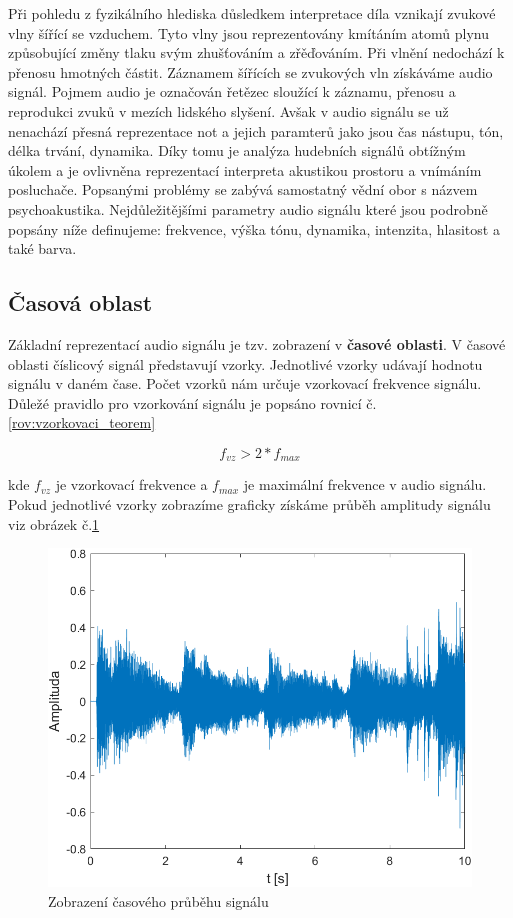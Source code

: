   Při pohledu z fyzikálního hlediska důsledkem interpretace díla vznikají zvukové vlny šířící se vzduchem.
  Tyto vlny jsou reprezentovány kmítáním atomů plynu způsobující změny tlaku svým zhušťováním a zřěďováním. Při vlnění nedochází k přenosu hmotných částit.
  Záznamem šířících se zvukových vln získáváme audio signál.
  Pojmem audio je označován řetězec sloužící k záznamu, přenosu a reprodukci zvuků v mezích lidského slyšení. 
  Avšak v audio signálu se už nenachází přesná reprezentace not a jejich paramterů jako jsou čas nástupu, tón, délka trvání, dynamika.
  Díky tomu je analýza hudebních signálů obtížným úkolem a je ovlivněna reprezentací interpreta akustikou prostoru a vnímáním posluchače.
  Popsanými problémy se zabývá samostatný vědní obor s názvem psychoakustika.
  Nejdůležitějšími parametry audio signálu které jsou podrobně popsány níže definujeme: frekvence, výška tónu, dynamika, intenzita, hlasitost a také barva.


  \subsection{Časová oblast}
  Základní reprezentací audio signálu je tzv. zobrazení v \textbf{časové oblasti}.
  V časové oblasti číslicový signál představují vzorky. Jednotlivé vzorky udávají hodnotu signálu v daném čase.
  Počet vzorků nám určuje vzorkovací frekvence signálu. Důležé pravidlo pro vzorkování signálu je popsáno rovnicí č. \ref{rov:vzorkovaci_teorem}
  
  \begin{equation}
    f_{vz} > 2 * f_{max}
    \label{rov:vzorkovaci_teorem}
  \end{equation}

  kde $f_{vz}$ je vzorkovací frekvence a $f_{max}$ je maximální frekvence v audio signálu.  
  Pokud jednotlivé vzorky zobrazíme graficky získáme průběh amplitudy signálu viz obrázek č.\ref{fig:Waveform}

  \begin{figure}[H]
    \centering
    \includegraphics[width = 0.8\linewidth]{obrazky/Waveform.png}
    \caption{Zobrazení časového průběhu signálu}
    \label{fig:Waveform}
  \end{figure}

